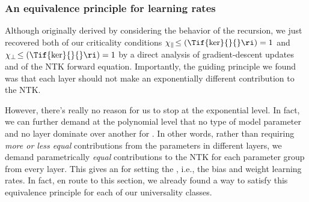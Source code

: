 \subsubsection{An equivalence principle for learning rates}
Although originally derived by considering the behavior of the  recursion, we just recovered both of our criticality conditions $\chi_{\parallel}\!\le(\Tif{\ker}{}{}\ri)=1$ and $\chi_{\perp}\!\le(\Tif{\ker}{}{}\ri)=1$ by a direct analysis of gradient-descent updates and of the NTK forward equation.
Importantly, the guiding principle we found was that each layer should not make an exponentially different contribution to the NTK.

However, there's really no reason for us to stop at the exponential level. In fact, we can further demand at the polynomial level that no type of model parameter and no layer dominate over another for . In other words, rather than requiring \emph{more or less equal} contributions from the parameters in different layers, we demand parametrically \emph{equal} contributions to the NTK for each parameter group from every layer. This gives an  for setting the , i.e., the bias and weight learning rates. 
In fact, en route to this section, we already found a way to satisfy this equivalence principle for each of our universality classes.














